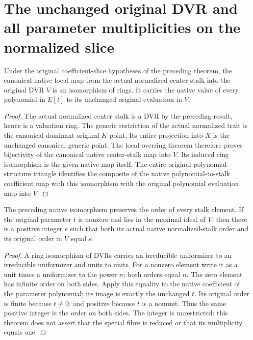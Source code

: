 \section{The unchanged original DVR and all parameter multiplicities on the normalized slice}
\begin{theorem}\label{thm:normalized-slice-original-center-ring}
Under the original coefficient-slice hypotheses of the preceding theorem, the canonical native local map from the actual normalized center stalk into the original DVR $V$ is an isomorphism of rings. It carries the native value of every polynomial in $E[t]$ to its unchanged original evaluation in $V$.
\leanok
\end{theorem}
\begin{proof}
The actual normalized center stalk is a DVR by the preceding result, hence is a valuation ring. The generic restriction of the actual normalized trait is the canonical dominant original $K$-point. Its entire projection into $X$ is the unchanged canonical generic point. The local-overring theorem therefore proves bijectivity of the canonical native center-stalk map into $V$. Its induced ring isomorphism is the given native map itself. The entire original polynomial-structure triangle identifies the composite of the native polynomial-to-stalk coefficient map with this isomorphism with the original polynomial evaluation map into $V$.
\end{proof}
\begin{theorem}\label{thm:normalized-slice-original-center-orders}
The preceding native isomorphism preserves the order of every stalk element. If the original parameter $t$ is nonzero and lies in the maximal ideal of $V$, then there is a positive integer $e$ such that both its actual native normalized-stalk order and its original order in $V$ equal $e$.
\leanok
\end{theorem}
\begin{proof}
A ring isomorphism of DVRs carries an irreducible uniformizer to an irreducible uniformizer and units to units. For a nonzero element write it as a unit times a uniformizer to the power $n$; both orders equal $n$. The zero element has infinite order on both sides. Apply this equality to the native coefficient of the parameter polynomial; its image is exactly the unchanged $t$. Its original order is finite because $t\ne0$, and positive because $t$ is a nonunit. Thus the same positive integer is the order on both sides. The integer is unrestricted: this theorem does not assert that the special fibre is reduced or that its multiplicity equals one.
\end{proof}
